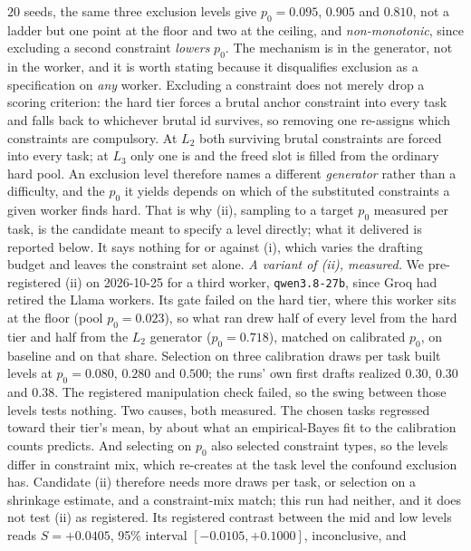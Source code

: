 \documentclass[11pt]{article}
\begin{document}
\begin{description}
    $20$ seeds, the same three exclusion levels give
    $p_0 = 0.095$, $0.905$ and $0.810$, not a ladder but one point at the floor and two at the
    ceiling, and \emph{non-monotonic}, since excluding a second constraint \emph{lowers} $p_0$.
    The mechanism is in the generator, not in the worker, and it is worth stating because it
    disqualifies exclusion as a specification on \emph{any} worker. Excluding a constraint does
    not merely drop a scoring criterion: the hard tier forces a brutal anchor constraint into
    every task and falls back to whichever brutal id survives, so removing one re-assigns which
    constraints are compulsory. At $L_2$ both surviving brutal constraints are forced into every
    task; at $L_3$ only one is and the freed slot is filled from the ordinary hard pool. An
    exclusion level therefore names a different \emph{generator} rather than a difficulty, and the
    $p_0$ it yields depends on which of the substituted constraints a given worker finds hard.
    That is why (ii), sampling to a target $p_0$ measured per task, is the candidate meant to
    specify a level directly; what it delivered is reported below. It says nothing for or against (i), which varies the drafting budget
    and leaves the constraint set alone.
    \emph{A variant of (ii), measured.} We pre-registered (ii) on 2026-10-25 for a third worker,
    \texttt{qwen3.8-27b}, since Groq had retired the Llama workers. Its gate failed on the hard
    tier, where this worker sits at the floor (pool $p_0 = 0.023$), so what ran drew half of every
    level from the hard tier and half from the $L_2$ generator ($p_0 = 0.718$), matched on
    calibrated $p_0$, on baseline and on that share. Selection on three calibration draws per task
    built levels at $p_0 = 0.080$, $0.280$ and $0.500$; the runs' own first drafts realized
    $0.30$, $0.30$ and $0.38$. The registered manipulation check failed, so the swing between
    those levels tests nothing. Two causes, both measured. The chosen tasks regressed toward their
    tier's mean, by about what an empirical-Bayes fit to the calibration counts predicts. And
    selecting on $p_0$ also selected constraint types, so the levels differ in constraint mix,
    which re-creates at the task level the confound exclusion has. Candidate (ii) therefore needs
    more draws per task, or selection on a shrinkage estimate, and a constraint-mix match; this
    run had neither, and it does not test (ii) as registered. Its registered contrast between the
    mid and low levels reads $S = +0.0405$, 95\% interval $[-0.0105, +0.1000]$, inconclusive, and

\end{description}
\end{document}
